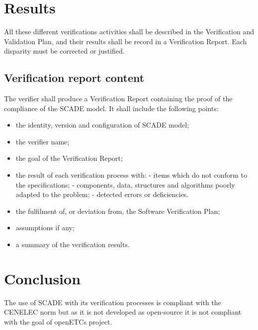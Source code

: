 \documentclass{article}
\begin{document}
\section{Results}

All these different verifications activities shall be described in the Verification and Validation Plan, and their results shall be record in a Verification Report. Each disparity must be corrected or justified.

\subsection{Verification report content}

The verifier shall produce a Verification Report containing the proof of the compliance of the SCADE model. It shall include the following points:
\begin{itemize}
\item the identity, version and configuration of SCADE model;
\item the verifier name;
\item the goal of the Verification Report;
\item the result of each verification process with:
\subitem - items which do not conform to the specifications;
\subitem - components, data, structures and algorithms poorly adapted to the problem;
\subitem - detected errors or deficiencies.
\item the fulfilment of, or deviation from, the Software Verification Plan;
\item assumptions if any;
\item a summary of the verification results.
\end{itemize}

\section{Conclusion}

The use of SCADE with its verification processes is compliant with the CENELEC norm but as it is not developed as open-source it is not compliant with the goal of openETCs project. 
\end{document}
